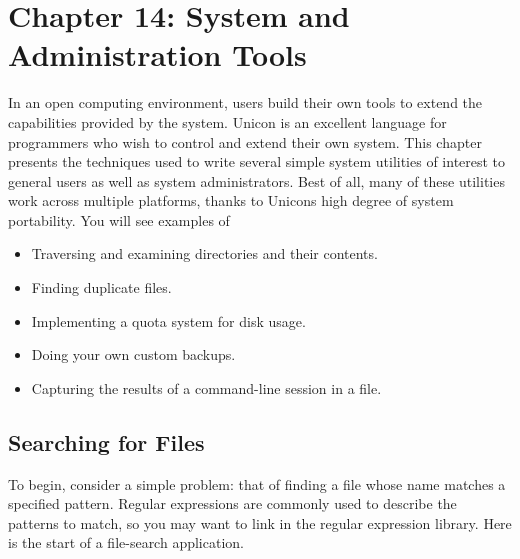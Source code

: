 \clearpage\section{Chapter 14: System and Administration Tools}

In an open computing environment, users build their own tools to extend
the capabilities provided by the system. Unicon is an excellent
language for programmers who wish to control and extend their own
system. This chapter presents the techniques used to write several
simple system utilities of interest to general users as well as system
administrators. Best of all, many of these utilities work across
multiple platforms, thanks to Unicon{\textquotesingle}s high degree of
system portability. You will see examples of

\begin{itemize}
\item Traversing and examining directories and their contents.
\item Finding duplicate files.
\item Implementing a quota system for disk usage.
\item Doing your own custom backups.
\item Capturing the results of a command-line session in a file.
\end{itemize}

\subsection{Searching for Files}

To begin, consider a simple problem: that of finding a file whose name
matches a specified pattern. Regular expressions are commonly used to
describe the patterns to match, so you may want to link in the regular
expression library. Here is the start of a file-search application.


